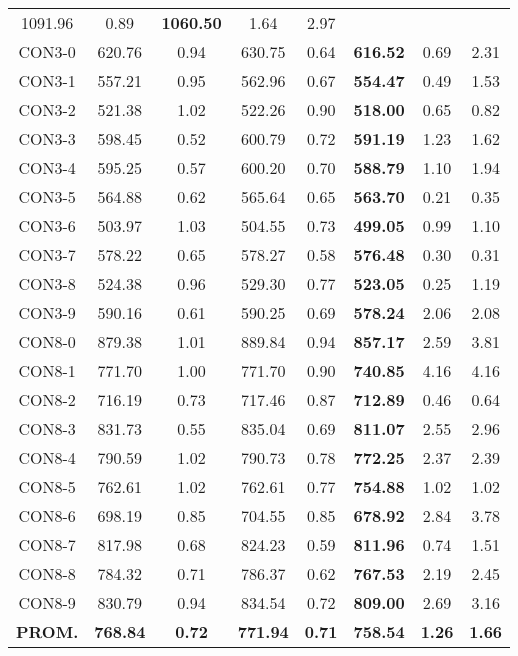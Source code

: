 \begin{table}[ht]
\begin{tabular}{c c c c c c c c}
1091.96 & 0.89 & \bf{1060.50} & 
1.64 & 2.97\\CON3-0 & 620.76 & 0.94 & 
630.75 & 0.64 & \bf{616.52} & 
0.69 & 2.31\\CON3-1 & 557.21 & 0.95 & 
562.96 & 0.67 & \bf{554.47} & 
0.49 & 1.53\\CON3-2 & 521.38 & 1.02 & 
522.26 & 0.90 & \bf{518.00} & 
0.65 & 0.82\\CON3-3 & 598.45 & 0.52 & 
600.79 & 0.72 & \bf{591.19} & 
1.23 & 1.62\\CON3-4 & 595.25 & 0.57 & 
600.20 & 0.70 & \bf{588.79} & 
1.10 & 1.94\\CON3-5 & 564.88 & 0.62 & 
565.64 & 0.65 & \bf{563.70} & 
0.21 & 0.35\\CON3-6 & 503.97 & 1.03 & 
504.55 & 0.73 & \bf{499.05} & 
0.99 & 1.10\\CON3-7 & 578.22 & 0.65 & 
578.27 & 0.58 & \bf{576.48} & 
0.30 & 0.31\\CON3-8 & 524.38 & 0.96 & 
529.30 & 0.77 & \bf{523.05} & 
0.25 & 1.19\\CON3-9 & 590.16 & 0.61 & 
590.25 & 0.69 & \bf{578.24} & 
2.06 & 2.08\\CON8-0 & 879.38 & 1.01 & 
889.84 & 0.94 & \bf{857.17} & 
2.59 & 3.81\\CON8-1 & 771.70 & 1.00 & 
771.70 & 0.90 & \bf{740.85} & 
4.16 & 4.16\\CON8-2 & 716.19 & 0.73 & 
717.46 & 0.87 & \bf{712.89} & 
0.46 & 0.64\\CON8-3 & 831.73 & 0.55 & 
835.04 & 0.69 & \bf{811.07} & 
2.55 & 2.96\\CON8-4 & 790.59 & 1.02 & 
790.73 & 0.78 & \bf{772.25} & 
2.37 & 2.39\\CON8-5 & 762.61 & 1.02 & 
762.61 & 0.77 & \bf{754.88} & 
1.02 & 1.02\\CON8-6 & 698.19 & 0.85 & 
704.55 & 0.85 & \bf{678.92} & 
2.84 & 3.78\\CON8-7 & 817.98 & 0.68 & 
824.23 & 0.59 & \bf{811.96} & 
0.74 & 1.51\\CON8-8 & 784.32 & 0.71 & 
786.37 & 0.62 & \bf{767.53} & 
2.19 & 2.45\\CON8-9 & 830.79 & 0.94 & 
834.54 & 0.72 & \bf{809.00} & 
2.69 & 3.16\\\bf{PROM.} & 
\bf{768.84} & \bf{0.72} & \bf{771.94} & \bf{0.71} & \bf{758.54} & \bf{1.26} & \bf{1.66}\\[1ex]\hline
\end{tabular}
\label{table:nonlin}
\end{table} 
\clearpage
